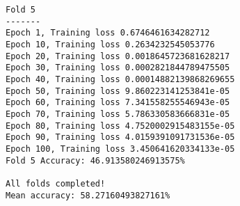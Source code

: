 \begin{verbatim}
Fold 5
-------
Epoch 1, Training loss 0.6746461634282712
Epoch 10, Training loss 0.2634232545053776
Epoch 20, Training loss 0.0018645723681628217
Epoch 30, Training loss 0.0002821844789475505
Epoch 40, Training loss 0.00014882139868269655
Epoch 50, Training loss 9.860223141253841e-05
Epoch 60, Training loss 7.341558255546943e-05
Epoch 70, Training loss 5.786330583666831e-05
Epoch 80, Training loss 4.7520002915483155e-05
Epoch 90, Training loss 4.0159391091731536e-05
Epoch 100, Training loss 3.450641620334133e-05
Fold 5 Accuracy: 46.913580246913575% 

All folds completed!
Mean accuracy: 58.27160493827161%
\end{verbatim}